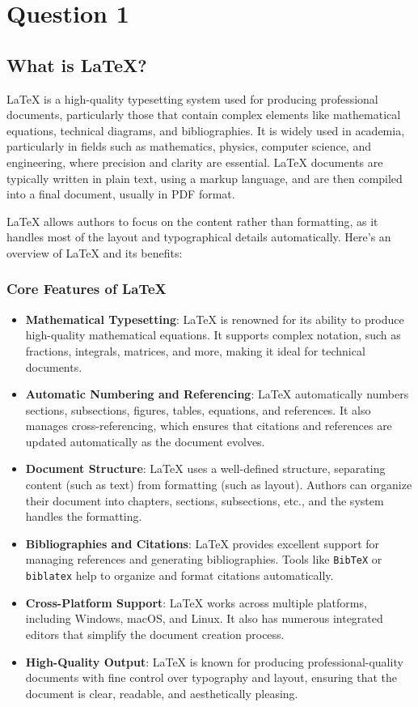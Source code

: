 \chapter*{Question 1}

\section{What is LaTeX?}

LaTeX is a high-quality typesetting system used for producing professional documents, particularly those that contain complex elements like mathematical equations, technical diagrams, and bibliographies. It is widely used in academia, particularly in fields such as mathematics, physics, computer science, and engineering, where precision and clarity are essential. LaTeX documents are typically written in plain text, using a markup language, and are then compiled into a final document, usually in PDF format.

LaTeX allows authors to focus on the content rather than formatting, as it handles most of the layout and typographical details automatically. Here's an overview of LaTeX and its benefits:

\subsection{Core Features of LaTeX}

\begin{itemize}
    \item \textbf{Mathematical Typesetting}: LaTeX is renowned for its ability to produce high-quality mathematical equations. It supports complex notation, such as fractions, integrals, matrices, and more, making it ideal for technical documents.
    \item \textbf{Automatic Numbering and Referencing}: LaTeX automatically numbers sections, subsections, figures, tables, equations, and references. It also manages cross-referencing, which ensures that citations and references are updated automatically as the document evolves.
    \item \textbf{Document Structure}: LaTeX uses a well-defined structure, separating content (such as text) from formatting (such as layout). Authors can organize their document into chapters, sections, subsections, etc., and the system handles the formatting.
    \item \textbf{Bibliographies and Citations}: LaTeX provides excellent support for managing references and generating bibliographies. Tools like \texttt{BibTeX} or \texttt{biblatex} help to organize and format citations automatically.
    \item \textbf{Cross-Platform Support}: LaTeX works across multiple platforms, including Windows, macOS, and Linux. It also has numerous integrated editors that simplify the document creation process.
    \item \textbf{High-Quality Output}: LaTeX is known for producing professional-quality documents with fine control over typography and layout, ensuring that the document is clear, readable, and aesthetically pleasing.
\end{itemize}

